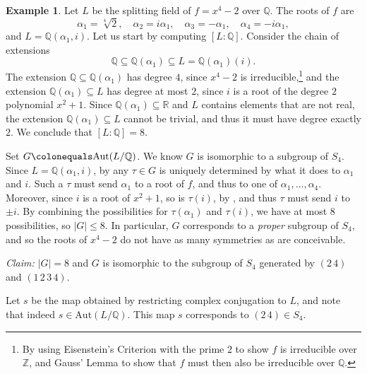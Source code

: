 \documentclass[12pt]{report}
\numberwithin{equation}{section}
\numberwithin{theorem}{chapter}
\theoremstyle{definition}
\newtheorem{example}[theorem]{Example}
\newtheorem*{basic properties}{Basic Properties}
\newtheorem*{Important Remark}{Important Remark}
\begin{document}
\begin{example}\label{example galois}
Let $L$ be the splitting field of $f = x^4-2$ over $\mathbb{Q}$. The roots of $f$ are 
$$\alpha_1 = \sqrt[4]{2}, \quad \alpha_2 = i \alpha_1, \quad \alpha_3 = - \alpha_1, \quad \alpha_4 = -i \alpha_1,$$
and $L = \mathbb{Q}(\alpha_1, i)$. Let us start by computing $[L:\mathbb{Q}]$. Consider the chain of extensions
$$\mathbb{Q} \subseteq \mathbb{Q}(\alpha_1) \subseteq L = \mathbb{Q}(\alpha_1)(i).$$
The extension $\mathbb{Q} \subseteq \mathbb{Q}(\alpha_1)$ has degree $4$, since $x^4 - 2$ is irreducible,\footnote{By using Eisenstein's Criterion with the prime $2$ to show $f$ is irreducible over $\mathbb{Z}$, and Gauss' Lemma to show that $f$ must then also be irreducible over $\mathbb{Q}$.} and the extension $\mathbb{Q}(\alpha_1) \subseteq L$ has degree at most $2$, since $i$ is a root of the degree $2$ polynomial $x^2+1$.
Since $\mathbb{Q}(\alpha_1) \subseteq \mathbb{R}$ and $L$ contains elements that are not real, the extension $\mathbb{Q}(\alpha_1) \subseteq L$ cannot be trivial, and thus it must have degree exactly $2$. We conclude that $[L:\mathbb{Q}] = 8$.



Set $G \colonequals \mathrm{Aut}(L/\mathbb{Q})$. We know $G$ is isomorphic to a subgroup of $S_4$. Since $L= \mathbb{Q}(\alpha_1, i)$, by  any $\tau \in G$ is uniquely determined by what it does to $\alpha_1$ and $i$. Such a $\tau$ must send $\alpha_1$ to a root of $f$, and thus to one of $\alpha_1, \ldots, \alpha_4$. Moreover, since $i$ is a root of $x^2 + 1$, so is $\tau(i)$, by , and thus $\tau$ must send $i$ to $\pm i$. By combining the possibilities for $\tau(\alpha_1)$ and $\tau(i)$, we have at most $8$ possibilities, so $|G| \leqslant 8$. In particular, $G$ corresponds to a {\em proper} subgroup of $S_4$, and so the roots of $x^4-2$ do not have as many symmetries as are conceivable.

{\em Claim:} $|G| = 8$ and $G$ is isomorphic to the subgroup of $S_4$ generated by $(2 \, 4)$ and $(1 \,2 \, 3 \,4)$. 

Let $s$ be the map obtained by restricting complex conjugation to $L$, and note that indeed $s \in \mathrm{Aut}(L/\mathbb{Q})$. This map $s$ corresponds to $(2 \, 4) \in S_4$.


\end{example}
\end{document}
